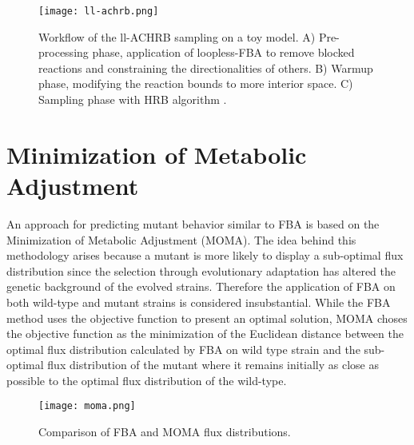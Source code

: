 \begin{figure}[H]
\begin{center}
\texttt{[image: ll-achrb.png]}
\end{center}
\caption[Workflow of the ll-ACHRB sampling on a toy model. A) Pre-processing phase, application of loopless-FBA to remove blocked reactions and constraining the directionalities of others. B) Warmup phase, modifying the reaction bounds to more interior space. C) Sampling phase with HRB algorithm \cite{saa2016ll}.]{Workflow of the ll-ACHRB sampling on a toy model. A) Pre-processing phase, application of loopless-FBA to remove blocked reactions and constraining the directionalities of others. B) Warmup phase, modifying the reaction bounds to more interior space. C) Sampling phase with HRB algorithm \cite{saa2016ll}.}
\label{fig:achrb}
\end{figure}


\section{Minimization of Metabolic Adjustment}
An approach for predicting mutant behavior similar to FBA is based on the Minimization of Metabolic Adjustment (MOMA). The idea behind this methodology arises because a mutant is more likely to display a sub-optimal flux distribution since the selection through evolutionary adaptation has altered the genetic background of the evolved strains. Therefore the application of FBA on both wild-type and mutant strains is considered insubstantial. While the FBA method uses the objective function to present an optimal solution, MOMA choses the objective function as the minimization of the Euclidean distance between the optimal flux distribution calculated by FBA on wild type strain and the sub-optimal flux distribution of the mutant where it remains initially as close as possible to the optimal flux distribution of the wild-type.

\begin{figure}[H]
\begin{center}
\texttt{[image: moma.png]}
\caption[Comparison of FBA and MOMA flux distributions]{Comparison of FBA and MOMA flux distributions.}
\end{center}
\label{fig:moma}
\end{figure}
\noindent


